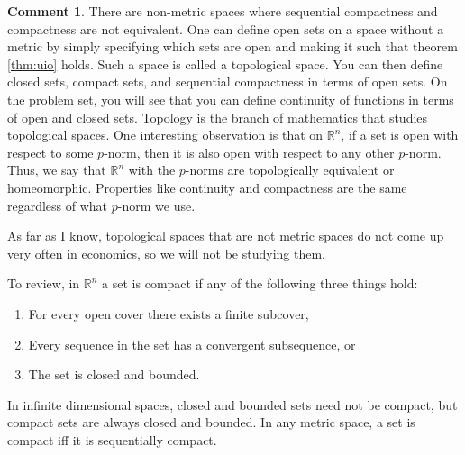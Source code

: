 \documentclass[12pt,reqno]{amsart}
\theoremstyle{definition}
\newtheorem{remark}{Comment}[section]
\def\R{\mathbb{R}}
\begin{document}
\begin{remark}
  There are non-metric spaces where sequential compactness and
  compactness are not equivalent. One can define open sets on a space
  without a metric by simply specifying which sets are open and making
  it such that theorem \ref{thm:uio} holds. Such a space is called a
  topological space. You can then define closed sets, compact sets,
  and sequential compactness in terms of open sets. On the problem
  set, you will see that you can define continuity of functions in
  terms of open and closed sets. Topology is the branch of mathematics
  that studies topological spaces. One interesting observation is that
  on $\R^n$, if a set is open with respect to some $p$-norm, then it
  is also open with respect to any other $p$-norm. Thus, we say that
  $\R^n$ with the $p$-norms are topologically equivalent or
  homeomorphic. Properties like continuity and compactness are the
  same regardless of what $p$-norm we use. 
  
  As far as I know, topological spaces that are not metric spaces do
  not come up very often in economics, so we will not be studying
  them.
\end{remark}

To review, in $\R^n$ a set is compact if any of the following three
things hold:
\begin{enumerate}
\item For every open cover there exists a finite subcover,
\item Every sequence in the set has a convergent subsequence, or
\item The set is closed and bounded.
\end{enumerate}
In infinite dimensional spaces, closed and bounded sets need not be
compact, but compact sets are always closed and bounded. In any metric
space, a set is compact iff it is sequentially compact.
\end{document}
